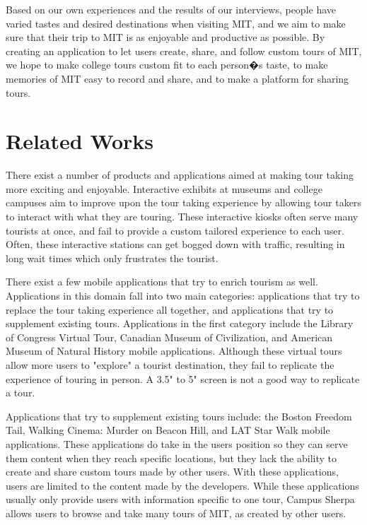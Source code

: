 \documentclass{sigchi}
\begin{document}
Based on our own experiences and the results of our interviews, people have varied tastes and desired destinations when visiting MIT, and we aim to make sure that their trip to MIT is as enjoyable and productive as possible. By creating an application to let users create, share, and follow custom tours of MIT, we hope to make college tours custom fit to each person�s taste, to make memories of MIT easy to record and share, and to make a platform for sharing tours.

\section{Related Works}

There exist a number of products and applications aimed at making tour taking more exciting and enjoyable. Interactive exhibits at museums and college campuses aim to improve upon the tour taking experience by allowing tour takers to interact with what they are touring. These interactive kiosks often serve many tourists at once, and fail to provide a custom tailored experience to each user. Often, these interactive stations can get bogged down with traffic, resulting in long wait times which only frustrates the tourist.

There exist a few mobile applications that try to enrich tourism as well. Applications in this domain fall into two main categories: applications that try to replace the tour taking experience all together, and applications that try to supplement existing tours. Applications in the first category include the Library of Congress Virtual Tour, Canadian Museum of Civilization, and American Museum of Natural History mobile applications. Although these virtual tours allow more users to "explore" a tourist destination, they fail to replicate the experience of touring in person. A 3.5" to 5" screen is not a good way to replicate a tour.

Applications that try to supplement existing tours include: the Boston Freedom Tail, Walking Cinema: Murder on Beacon Hill, and LAT Star Walk mobile applications. These applications do take in the users position so they can serve them content when they reach specific locations, but they lack the ability to create and share custom tours made by other users. With these applications, users are limited to the content made by the developers. While these applications usually only provide users with information specific to one tour, Campus Sherpa allows users to browse and take many tours of MIT, as created by other users.
\end{document}
